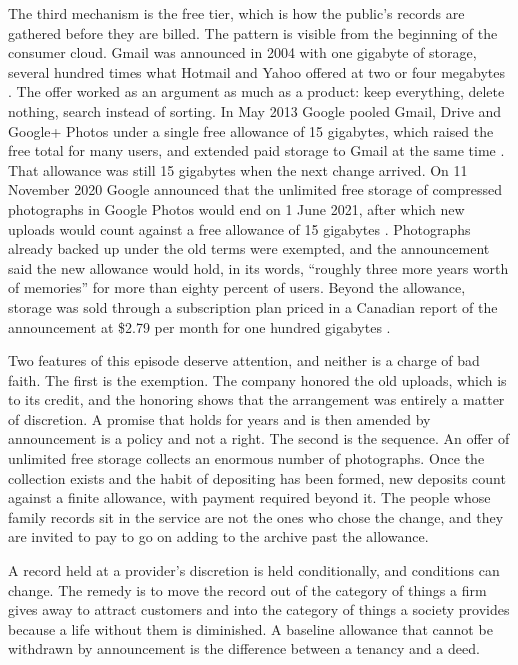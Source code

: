 \documentclass[11pt]{article}
\begin{document}
The third mechanism is the free tier, which is how the public's records are gathered before they are billed. The pattern is visible from the beginning of the consumer cloud. Gmail was announced in 2004 with one gigabyte of storage, several hundred times what Hotmail and Yahoo offered at two or four megabytes \cite{sciencealert}. The offer worked as an argument as much as a product: keep everything, delete nothing, search instead of sorting. In May 2013 Google pooled Gmail, Drive and Google+ Photos under a single free allowance of 15 gigabytes, which raised the free total for many users, and extended paid storage to Gmail at the same time \cite{gmailblog}. That allowance was still 15 gigabytes when the next change arrived. On 11 November 2020 Google announced that the unlimited free storage of compressed photographs in Google Photos would end on 1 June 2021, after which new uploads would count against a free allowance of 15 gigabytes \cite{googlephotos}. Photographs already backed up under the old terms were exempted, and the announcement said the new allowance would hold, in its words, ``roughly three more years worth of memories'' for more than eighty percent of users. Beyond the allowance, storage was sold through a subscription plan priced in a Canadian report of the announcement at \$2.79 per month for one hundred gigabytes \cite{iphonecanada}.

Two features of this episode deserve attention, and neither is a charge of bad faith. The first is the exemption. The company honored the old uploads, which is to its credit, and the honoring shows that the arrangement was entirely a matter of discretion. A promise that holds for years and is then amended by announcement is a policy and not a right. The second is the sequence. An offer of unlimited free storage collects an enormous number of photographs. Once the collection exists and the habit of depositing has been formed, new deposits count against a finite allowance, with payment required beyond it. The people whose family records sit in the service are not the ones who chose the change, and they are invited to pay to go on adding to the archive past the allowance.

A record held at a provider's discretion is held conditionally, and conditions can change. The remedy is to move the record out of the category of things a firm gives away to attract customers and into the category of things a society provides because a life without them is diminished. A baseline allowance that cannot be withdrawn by announcement is the difference between a tenancy and a deed.
\end{document}
